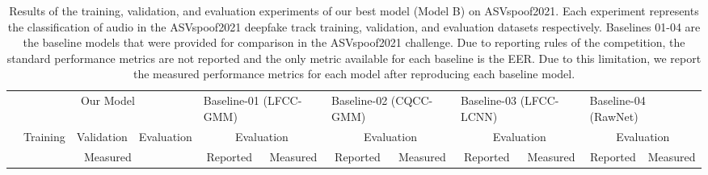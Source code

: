 \documentclass[10pt, journal, anonymous=true]{IEEEtran}
\begin{document}
\begin{table*}[]
    \centering
    \caption{Results of the training, validation, and evaluation experiments of our best model (Model B) on ASVspoof2021. Each experiment represents the classification of audio in the ASVspoof2021 deepfake track training, validation, and evaluation datasets respectively. Baselines 01-04 are the baseline models that were provided for comparison in the ASVspoof2021 challenge. Due to reporting rules of the competition, the standard performance metrics are not reported and the only metric available for each baseline is the EER. Due to this limitation, we report the measured performance metrics for each model after reproducing each baseline model.}
    \label{tbl:models}
        \resizebox{\textwidth}{!}
        {\begin{tabular}{|c|ccc|cc|cc|cc|cc|}
        \hline
        \multicolumn{1}{|l|}{}                   & \multicolumn{3}{c|}{Our Model}                                                                                                               & \multicolumn{2}{l|}{Baseline-01 (LFCC-GMM)}                                         & \multicolumn{2}{l|}{Baseline-02 (CQCC-GMM)}                                         & \multicolumn{2}{l|}{Baseline-03 (LFCC-LCNN)}                                        & \multicolumn{2}{l|}{Baseline-04 (RawNet)}                                           \\ \cline{2-12} 
        \multicolumn{1}{|l|}{}                   & \multicolumn{1}{l|}{Training}                       & \multicolumn{1}{l|}{Validation}                      & \multicolumn{1}{l|}{Evaluation} & \multicolumn{2}{c|}{Evaluation}                                                     & \multicolumn{2}{c|}{Evaluation}                                                     & \multicolumn{2}{c|}{Evaluation}                                                     & \multicolumn{2}{c|}{Evaluation}                                                     \\ \cline{2-12} 
        \multicolumn{1}{|l|}{\multirow{-3}{*}{}} & \multicolumn{3}{c|}{Measured}                                                                                                                & \multicolumn{1}{c|}{Reported}                        & Measured                      & \multicolumn{1}{c|}{Reported}                        & Measured                      & \multicolumn{1}{c|}{Reported}                        & Measured                      & \multicolumn{1}{c|}{Reported}                        & Measured                      \\ \hline

\end{tabular}}
\end{table*}
\end{document}

